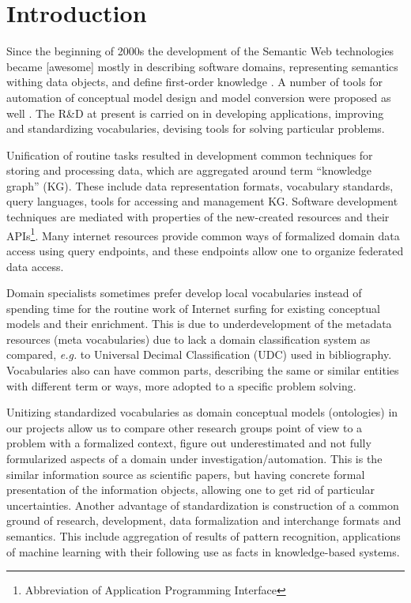 \documentclass[
]{ceurart}
\begin{document}
\maketitle

\section{Introduction}

Since the beginning of 2000s the development of the Semantic Web technologies became [awesome] mostly in describing software domains, representing semantics withing data objects, and define first-order knowledge \cite{}.  A number of tools for automation of conceptual model design and model conversion were proposed as well \cite{}.  The R\&D at present is carried on in developing applications, improving and standardizing vocabularies, devising tools for solving particular problems.

Unification of routine tasks resulted in development common techniques for storing and processing data, which are aggregated around term ``knowledge graph'' (KG).  These include data representation formats, vocabulary standards, query languages, tools for accessing and management KG.  Software development techniques are mediated with properties of the new-created resources and their APIs\footnote{Abbreviation of Application Programming Interface}.  Many internet resources provide common ways of formalized domain data access using query endpoints, and these endpoints allow one to organize federated data access.

Domain specialists sometimes prefer develop local vocabularies instead of spending time for the routine work of Internet surfing for existing conceptual models and their enrichment.  This is due to underdevelopment of the metadata resources (meta vocabularies) due to lack a domain classification system as compared, \emph{e.g.} to Universal Decimal Classification (UDC) used in bibliography.  Vocabularies also can have common parts, describing the same or similar entities with different term or ways, more adopted to a specific problem solving.

Unitizing standardized vocabularies as domain conceptual models (ontologies) in our projects allow us to compare other research groups point of view to a problem with a formalized context, figure out underestimated and not fully formularized aspects of a domain under investigation/automation.  This is the similar information source as scientific papers, but having concrete formal presentation of the information objects, allowing one to get rid of particular uncertainties.  Another advantage of standardization is construction of a common ground of research, development, data formalization and interchange formats and semantics.  This include aggregation of results of pattern recognition, applications of machine learning with their following use as facts in knowledge-based systems.
\end{document}
